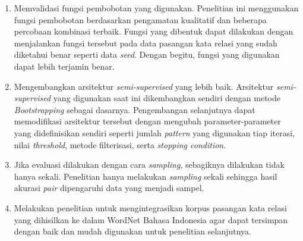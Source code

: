 \begin{enumerate}
  \item Memvalidasi fungsi pembobotan yang digunakan. Penelitian ini menggunakan fungsi pembobotan berdasarkan pengamatan kualitatif dan beberapa percobaan kombinasi terbaik. Fungsi yang dibentuk dapat dilakukan dengan menjalankan fungsi tersebut pada data pasangan kata relasi yang sudah diketahui benar seperti data \textit{seed}. Dengan begitu, fungsi yang digunakan dapat lebih terjamin benar.
  \item Mengembangkan arsitektur \textit{semi-supervised} yang lebih baik. Arsitektur \textit{semi-supervised} yang digunakan saat ini dikembangkan sendiri dengan metode \textit{Bootstrapping} sebagai dasarnya. Pengembangan selanjutnya dapat memodifikasi arsitektur tersebut dengan mengubah parameter-parameter yang didefinisikan sendiri seperti jumlah \textit{pattern} yang digunakan tiap iterasi, nilai \textit{threshold}, metode filterisasi, serta \textit{stopping condition}.
  \item Jika evaluasi dilakukan dengan cara \textit{sampling}, sebagiknya dilakukan tidak hanya sekali. Penelitian hanya melakukan \textit{sampling} sekali sehingga hasil akurasi \textit{pair} dipengaruhi data yang menjadi sampel.
  \item Melakukan penelitian untuk mengintegrasikan korpus pasangan kata relasi yang dihisilkan ke dalam WordNet Bahasa Indonesia agar dapat tersimpan dengan baik dan mudah digunakan untuk penelitian selanjutnya.
\end{enumerate}

